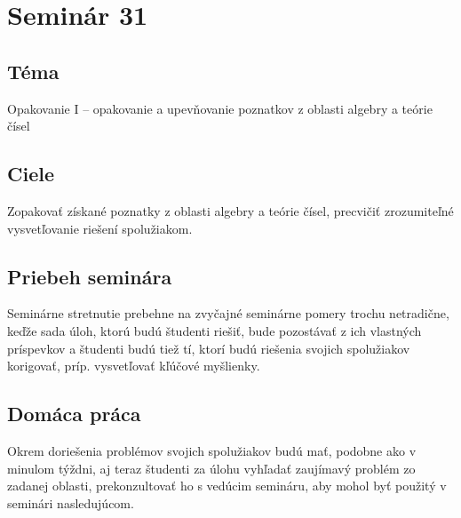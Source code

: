 \section*{Seminár 31}


\subsection*{Téma}
Opakovanie I -- opakovanie a upevňovanie poznatkov z oblasti algebry a teórie čísel
\subsection*{Ciele}
Zopakovať získané poznatky z oblasti algebry a teórie čísel, precvičiť zrozumiteľné vysvetľovanie riešení spolužiakom.

\subsection*{Priebeh seminára}
Seminárne stretnutie prebehne na zvyčajné seminárne pomery trochu netradične, keďže sada úloh, ktorú budú študenti riešiť, bude pozostávať z ich vlastných príspevkov a študenti budú tiež tí, ktorí budú riešenia svojich spolužiakov korigovať, príp. vysvetľovať kľúčové myšlienky.

\subsection*{Domáca práca}
Okrem doriešenia problémov svojich spolužiakov budú mať, podobne ako v minulom týždni, aj teraz študenti za úlohu vyhľadať zaujímavý problém zo zadanej oblasti, prekonzultovať ho s vedúcim semináru, aby mohol byť použitý v seminári nasledujúcom.
